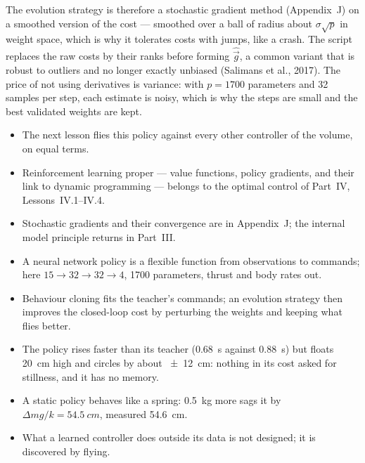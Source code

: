 The evolution strategy is therefore a stochastic gradient method (Appendix~J) on a smoothed version of the cost — smoothed over a ball of radius about $\sigma\sqrt p$ in weight space, which is why it tolerates costs with jumps, like a crash. The script replaces the raw costs by their ranks before forming $\hat{\vec g}$, a common variant that is robust to outliers and no longer exactly unbiased (Salimans et al., 2017). The price of not using derivatives is variance: with $p = 1700$ parameters and 32 samples per step, each estimate is noisy, which is why the steps are small and the best validated weights are kept.

\begin{lookahead}
\begin{itemize}[leftmargin=1.2em]
  \item The next lesson flies this policy against every other controller of the volume, on equal terms.
  \item Reinforcement learning proper — value functions, policy gradients, and their link to dynamic programming — belongs to the optimal control of Part~IV, Lessons~IV.1--IV.4.
  \item Stochastic gradients and their convergence are in Appendix~J; the internal model principle returns in Part~III.
\end{itemize}
\end{lookahead}

\begin{remember}
\begin{itemize}
  \item A neural network policy is a flexible function from observations to commands; here $15 \to 32 \to 32 \to 4$, 1700 parameters, thrust and body rates out.
  \item Behaviour cloning fits the teacher's commands; an evolution strategy then improves the closed-loop cost by perturbing the weights and keeping what flies better.
  \item The policy rises faster than its teacher (\SI{0.68}{s} against \SI{0.88}{s}) but floats \SI{20}{cm} high and circles by about \SI{\pm12}{cm}: nothing in its cost asked for stillness, and it has no memory.
  \item A static policy behaves like a spring: \SI{0.5}{kg} more sags it by $\Delta mg/k = \SI{54.5}{cm}$, measured \SI{54.6}{cm}.
  \item What a learned controller does outside its data is not designed; it is discovered by flying.
\end{itemize}
\end{remember}

